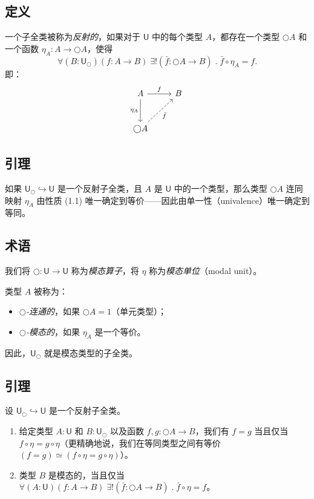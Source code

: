 \documentclass[UTF8]{ctexart}
\theoremstyle{definition}
\newcommand{\U}{\mathsf{U}}
\newcommand{\modal}{\bigcirc}
\begin{document}
\subsection{定义}

一个子全类被称为\emph{反射的}，如果对于 $\U$ 中的每个类型 $A$，都存在一个类型 $\modal A$ 和一个函数 $\eta_A : A \to \modal A$，使得
\[
\forall(B:\U_{\modal})(f : A \to B)\; \exists!(\bar{f} : \modal A \to B)\;.\; \bar{f} \circ \eta_A = f.
\]
即：
\[
\begin{tikzcd}[row sep=large]
A \arrow[r, "f"] \arrow[d, "\eta_A"'] & B \\
\modal A \arrow[ur, "\bar{f}"', dashed] &
\end{tikzcd}
\]

\subsection{引理}

如果 $\U_{\modal} \hookrightarrow \U$ 是一个反射子全类，且 $A$ 是 $\U$ 中的一个类型，那么类型 $\modal A$ 连同映射 $\eta_A$ 由性质 (1.1) 唯一确定到等价——因此由单一性（univalence）唯一确定到等同。

\subsection{术语}

我们将 $\modal : \U \to \U$ 称为\emph{模态算子}，将 $\eta$ 称为\emph{模态单位}（modal unit）。

类型 $A$ 被称为：
\begin{itemize}
    \item \emph{$\modal$-连通的}，如果 $\modal A = 1$（单元类型）；
    \item \emph{$\modal$-模态的}，如果 $\eta_A$ 是一个等价。
\end{itemize}
因此，$\U_{\modal}$ 就是模态类型的子全类。

\subsection{引理}

设 $\U_{\modal} \hookrightarrow \U$ 是一个反射子全类。
\begin{enumerate}
    \item 给定类型 $A:\U$ 和 $B:\U_{\modal}$ 以及函数 $f, g : \modal A \to B$，我们有 $f = g$ 当且仅当 $f \circ \eta = g \circ \eta$（更精确地说，我们在等同类型之间有等价 $(f=g) \simeq (f\circ\eta = g\circ\eta)$）。
    
    \item 类型 $B$ 是模态的，当且仅当 $\forall(A:\U)(f:A\to B)\; \exists!(\bar{f}:\modal A \to B)\;.\; \bar{f}\circ\eta = f$。
\end{enumerate}
\end{document}
